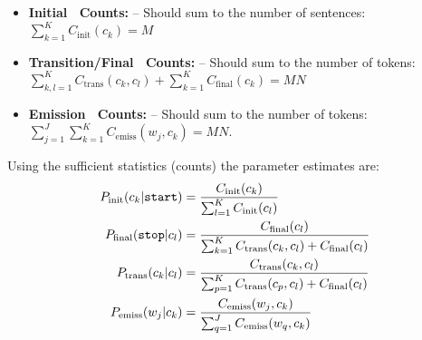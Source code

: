 \begin{itemize}
\item \textbf{Initial \ Counts\!:} -- Should sum to the number of
  sentences: $\sum_{k=1}^K C_{\mathrm{init}}(c_k) = M$
\item \textbf{Transition/Final \ Counts\!:} -- Should sum to the number of
  tokens: 
  $\sum_{k,l=1}^K C_{\mathrm{trans}}(c_k,c_l) + \sum_{k=1}^K C_{\mathrm{final}}(c_k) = MN$
\item \textbf{Emission \ Counts\!:} -- Should sum to the number of tokens: $\sum_{j=1}^J\sum_{k=1}^K C_{\mathrm{emiss}}(w_j,c_k) = MN$.
\end{itemize}

Using the sufficient statistics (counts) the parameter estimates are: 
\begin{align}
  P_{\mathrm{init}}(c_k | \text{\tt start}) &=  \frac{C_{\mathrm{init}}(c_k)}{\sum_{l=1}^K
    C_{\mathrm{init}}(c_l)}\\
  P_{\mathrm{final}}(\text{\tt stop} | c_l) &=  \frac{C_{\mathrm{final}}(c_l)}{\sum_{k=1}^K
    C_{\mathrm{trans}}(c_k,c_l) + C_{\mathrm{final}}(c_l)}\\
  P_{\mathrm{trans}}(c_k | c_l) &=  \frac{C_{\mathrm{trans}}(c_k,c_l)}{\sum_{p=1}^K
    C_{\mathrm{trans}}(c_p,c_l) + C_{\mathrm{final}}(c_l)}\\
  P_{\mathrm{emiss}}(w_j | c_k) &=  \frac{C_{\mathrm{emiss}}(w_j,c_k)}{\sum_{q=1}^J
    C_{\mathrm{emiss}}(w_q,c_k)}
\end{align}


%
%
%
%
%



